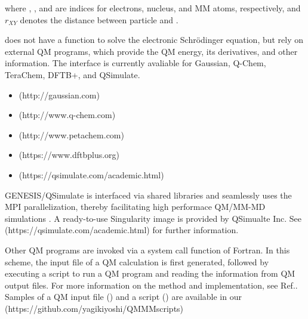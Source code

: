 \documentclass[a4paper,11pt,oneside,english]{sphinxmanual}
\begin{document}
where , , and  are indices for electrons, nucleus, and MM
atoms, respectively, and \(r_{XY}\) denotes the distance between
particle  and .

 does not have a function to solve the electronic Schrödinger
equation, but rely on external QM programs, which provide
the QM energy, its derivatives, and other information.
The interface is currently avaliable for Gaussian, Q-Chem, TeraChem,
DFTB+, and QSimulate.
\begin{itemize}
\item {} 
 (http://gaussian.com)

\item {} 
 (http://www.q-chem.com)

\item {} 
 (http://www.petachem.com)

\item {} 
 (https://www.dftbplus.org)

\item {} 
 (https://qsimulate.com/academic.html)

\end{itemize}

GENESIS/QSimulate is interfaced via shared libraries and seamlessly uses
the MPI parallelization, thereby facilitating high performace QM/MM-MD
simulations . A ready-to-use Singularity image is
provided by QSimualte Inc.  See  (https://qsimulate.com/academic.html)
for further information.

Other QM programs are invoked via a system call function of Fortran. In this
scheme, the input file of a QM calculation is first generated, followed by
executing a script to run a QM program and reading the information from
QM output files.  For more information on the method and implementation,
see Ref..  Samples of a QM input file
() and a script () are available in our
 (https://github.com/yagikiyoshi/QMMMscripts)
\end{document}
